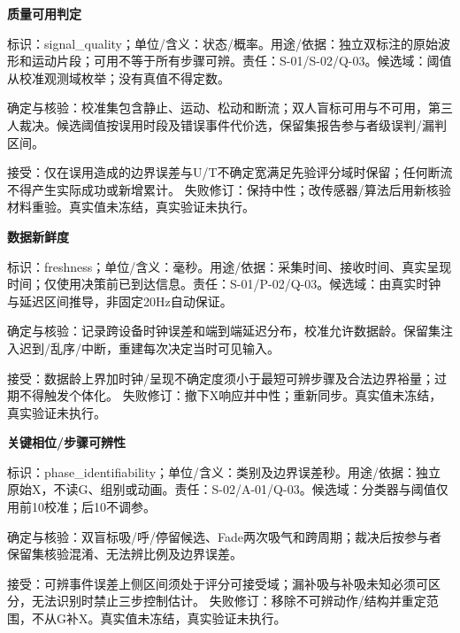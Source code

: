 \documentclass[11pt,a4paper]{article}
\newcommand{\reviewsubsection}[1]{\par\Needspace{4\baselineskip}\begin{center}{\titlelatin\titlecjk\bfseries\fontsize{12}{18}\selectfont #1}\end{center}}
\begin{document}
\begin{minipage}{\linewidth}
\reviewsubsection{8.1 质量可用判定}
标识：signal\_\allowbreak{}quality；单位/\allowbreak{}含义：状态/\allowbreak{}概率。用途/\allowbreak{}依据：独立双标注的原始波形和运动片段；可用不等于所有步骤可辨。责任：S-\allowbreak{}01/\allowbreak{}S-\allowbreak{}02/\allowbreak{}Q-\allowbreak{}03。候选域：阈值从校准观测域枚举；没有真值不得定数。

确定与核验：校准集包含静止、运动、松动和断流；双人盲标可用与不可用，第三人裁决。候选阈值按误用时段及错误事件代价选，保留集报告参与者级误判/\allowbreak{}漏判区间。

接受：仅在误用造成的边界误差与U/\allowbreak{}T不确定宽满足先验评分域时保留；任何断流不得产生实际成功或新增累计。 失败修订：保持中性；改传感器/\allowbreak{}算法后用新核验材料重验。真实值未冻结，真实验证未执行。
\end{minipage}\par

\begin{minipage}{\linewidth}
\reviewsubsection{8.2 数据新鲜度}
标识：freshness；单位/\allowbreak{}含义：毫秒。用途/\allowbreak{}依据：采集时间、接收时间、真实呈现时间；仅使用决策前已到达信息。责任：S-\allowbreak{}01/\allowbreak{}P-\allowbreak{}02/\allowbreak{}Q-\allowbreak{}03。候选域：由真实时钟与延迟区间推导，非固定20Hz自动保证。

确定与核验：记录跨设备时钟误差和端到端延迟分布，校准允许数据龄。保留集注入迟到/\allowbreak{}乱序/\allowbreak{}中断，重建每次决定当时可见输入。

接受：数据龄上界加时钟/\allowbreak{}呈现不确定度须小于最短可辨步骤及合法边界裕量；过期不得触发个体化。 失败修订：撤下X响应并中性；重新同步。真实值未冻结，真实验证未执行。
\end{minipage}\par

\begin{minipage}{\linewidth}
\reviewsubsection{8.3 关键相位/步骤可辨性}
标识：phase\_\allowbreak{}identifiability；单位/\allowbreak{}含义：类别及边界误差秒。用途/\allowbreak{}依据：独立原始X，不读G、组别或动画。责任：S-\allowbreak{}02/\allowbreak{}A-\allowbreak{}01/\allowbreak{}Q-\allowbreak{}03。候选域：分类器与阈值仅用前10校准；后10不调参。

确定与核验：双盲标吸/\allowbreak{}呼/\allowbreak{}停留候选、Fade两次吸气和跨周期；裁决后按参与者保留集核验混淆、无法辨比例及边界误差。

接受：可辨事件误差上侧区间须处于评分可接受域；漏补吸与补吸未知必须可区分，无法识别时禁止三步控制估计。 失败修订：移除不可辨动作/\allowbreak{}结构并重定范围，不从G补X。真实值未冻结，真实验证未执行。
\end{minipage}\par
\end{document}
